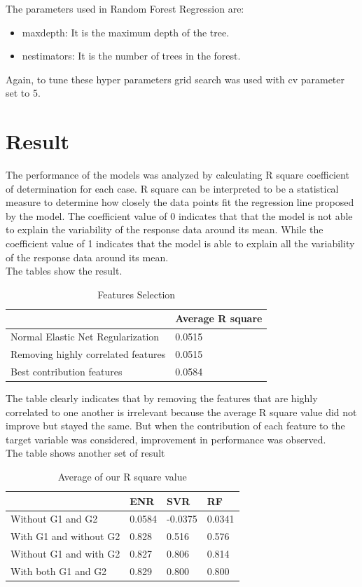 \documentclass[conference]{IEEEtran}
\begin{document}
The parameters used in Random Forest Regression are:
\begin{itemize}
    \item max\textunderscore depth: It is the maximum depth of the tree.
    \item n\textunderscore estimators: It is the number of trees in the forest.
\end{itemize}
Again, to tune these hyper parameters grid search was used with cv parameter set to 5.

\section{Result}
The performance of the models was analyzed by calculating R square coefficient of determination for each case. R square can be interpreted to be a statistical measure to determine how closely the data points fit the regression line proposed by the model.
The coefficient value of 0 indicates that that the model is not able to explain the variability of the response data around its mean.
While the coefficient value of 1 indicates that the model is able to explain all the variability of the response data around its mean.\\
The tables show the result.
\begin{table}[!htbp]
\caption{Features Selection}
\begin{tabular}{|p{5cm}|p{3cm}|}
\hline
\textbf{ } & \textbf{Average R square} \\
\hline
Normal Elastic Net Regularization&0.0515\\
\hline
Removing highly correlated features&0.0515\\
\hline
Best contribution features&0.0584\\
\hline
\end{tabular}
\label{tab1}
\end{table}
The table clearly indicates that by removing the features that are highly correlated to one another is irrelevant because the average R square value did not improve but stayed the same.
But when the contribution of each feature to the target variable was considered, improvement in performance was observed.
\\The table shows another set of result
\begin{table}[!htbp]
\caption{Average of our R square value}
\begin{tabular}{|p{4.25cm}|p{1cm}|p{1cm}|p{1cm}|}
\hline
\textbf{ } & \textbf{ENR} & \textbf{SVR} & \textbf{RF} \\
\hline
Without G1 and G2&0.0584&-0.0375&0.0341\\
\hline
With G1 and without G2&0.828&0.516&0.576\\
\hline
Without G1 and with G2&0.827&0.806&0.814\\
\hline
With both G1 and G2&0.829&0.800&0.800\\
\hline
\end{tabular}
\label{tab1}
\end{table}
\end{document}
